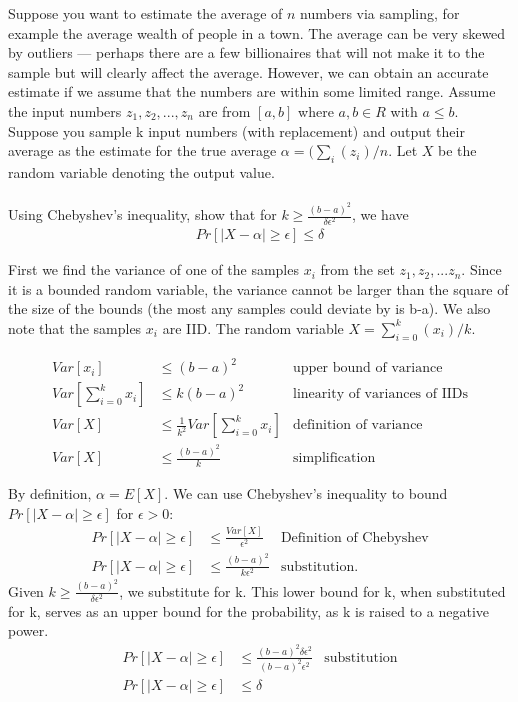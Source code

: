 \documentclass[11pt]{article}
\begin{document}



Suppose you want to estimate the average of $n$ numbers via sampling, for example the average wealth of people in a town. The average can be very skewed by outliers — perhaps there are a few billionaires that will not make
it to the sample but will clearly affect the average. However, we can obtain an accurate estimate if we assume that the numbers are within some limited range. Assume the input numbers $z_1, z_2, . . . , z_n$ are from $[a, b]$ where $a, b \in R$ with $a \leq b$. Suppose you sample k input numbers (with replacement) and output their average as the estimate for the true average $\alpha = (\sum_i
(z_i)/n$. Let $X$ be the random variable denoting the output value. \\  \\
Using Chebyshev’s inequality, show that for $k \geq \frac{(b-a)^2}{\delta \epsilon^2}$, we have
\begin{align*}
Pr[|X-\alpha| \geq \epsilon] \leq \delta
\end{align*}

\begin{solution}
First we find the variance of one of the samples $x_i$ from the set $z_1, z_2, ...z_n$. Since it is a bounded random variable, the variance cannot be larger than the square of the size of the bounds (the most any samples could deviate by is b-a). We also note that the samples $x_i$ are IID. The random variable $X=\sum_{i=0}^{k}(x_i)/k$.

\begin{align*}
Var[x_i]&\leq  (b-a)^2  & \text{upper bound of variance} \\
Var[\sum_{i=0}^{k}x_i]&\leq  k(b-a)^2 & \text{linearity of variances of IIDs}\\
Var[X]&\leq  \frac{1}{k^2}Var[\sum_{i=0}^{k}x_i] & \text{definition of variance}\\
Var[X]&\leq  \frac{(b-a)^2}{k} & \text{simplification}
\end{align*}

By definition, $\alpha=E[X]$. We can use Chebyshev's inequality to bound $Pr[|X-\alpha| \geq \epsilon]$ for $\epsilon>0$:
\begin{align*}
Pr[|X-\alpha| \geq \epsilon] &\leq \frac{Var[X]}{\epsilon^2} & \text{Definition of Chebyshev} \\
Pr[|X-\alpha| \geq \epsilon] &\leq \frac{(b-a)^2}{k\epsilon^2} & \text{substitution}. 
\end{align*} 
Given $k \geq \frac{(b-a)^2}{\delta \epsilon^2}$, we substitute for k. This lower bound for k, when substituted for k, serves as an upper bound for the probability, as k is raised to a negative power.
\begin{align*}
Pr[|X-\alpha| \geq \epsilon] &\leq \frac{(b-a)^2 \delta \epsilon^2}{(b-a)^2 \epsilon^2} & \text{substitution} \\
Pr[|X-\alpha| \geq \epsilon] &\leq \delta
\end{align*} 
\end{solution}
\clearpage
{}
\end{document}
